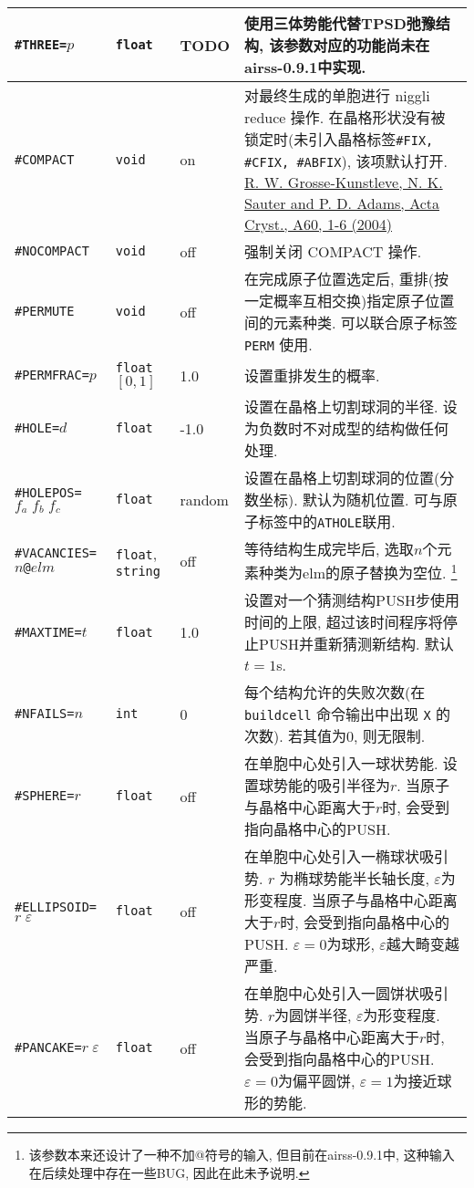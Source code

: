 \documentclass[a4paper, 10pt]{article}
\begin{document}
\begin{center}
\begin{longtable}{m{10em}|m{4em}<{\centering}|m{3em}<{\centering}|m{15em}}
\midrule
\verb|#THREE=|\(p\)& \verb|float| & TODO & 使用三体势能代替TPSD弛豫结构, \textbf{该参数对应的功能尚未在airss-0.9.1中实现}.\\
\midrule
\verb|#COMPACT|& \verb|void| & on & 对最终生成的单胞进行 niggli reduce 操作. 在晶格形状没有被锁定时(未引入晶格标签\verb|#FIX, #CFIX, #ABFIX|), 该项默认打开. \href{http://atztogo.github.io/niggli/#algorithm}{R. W. Grosse-Kunstleve, N. K. Sauter and P. D. Adams, Acta Cryst., A60, 1-6 (2004)} \\
\midrule
\verb|#NOCOMPACT| & \verb|void| & off & 强制关闭 COMPACT 操作.\\
\midrule
\verb|#PERMUTE| & \verb|void| & off & 在完成原子位置选定后, 重排(按一定概率互相交换)指定原子位置间的元素种类. 可以联合原子标签 \verb|PERM| 使用.\\
\midrule
\verb|#PERMFRAC=|\(p\) & \verb|float| \([0,1]\)  & 1.0 & 设置重排发生的概率.\\
\midrule
\verb|#HOLE=|\(d\) & \verb|float| & -1.0 & 设置在晶格上切割球洞的半径. 设为负数时不对成型的结构做任何处理.\\
\midrule
\verb|#HOLEPOS=|\(f_a\;f_b\;f_c\) & \verb|float| & random & 设置在晶格上切割球洞的位置(分数坐标). 默认为随机位置. 可与原子标签中的\verb|ATHOLE|联用.\\
\midrule
\verb|#VACANCIES=|\(n\)\verb|@|\(elm\)& \verb|float|, \verb|string| & off & 等待结构生成完毕后, 选取\(n\)个元素种类为elm的原子替换为空位. \footnote{该参数本来还设计了一种不加@符号的输入, 但目前在airss-0.9.1中, 这种输入在后续处理中存在一些BUG, 因此在此未予说明.}\\
\midrule
\verb|#MAXTIME=|\(t\)& \verb|float| & 1.0 & 设置对一个猜测结构PUSH步使用时间的上限, 超过该时间程序将停止PUSH并重新猜测新结构. 默认\(t=1\)s.\\
\midrule
\verb|#NFAILS=|\(n\)& \verb|int| & 0 & 每个结构允许的失败次数(在 \verb|buildcell| 命令输出中出现 \verb|X| 的次数). 若其值为0, 则无限制.\\
\midrule
\verb|#SPHERE=|\(r\) & \verb|float| & off & 在单胞中心处引入一球状势能. 设置球势能的吸引半径为\(r\). 当原子与晶格中心距离大于\(r\)时, 会受到指向晶格中心的PUSH.\\
\midrule
\verb|#ELLIPSOID=|\(r\;\varepsilon\) & \verb|float|  & off & 在单胞中心处引入一椭球状吸引势. \(r\) 为椭球势能半长轴长度, \(\varepsilon\)为形变程度. 当原子与晶格中心距离大于\(r\)时, 会受到指向晶格中心的PUSH. \(\varepsilon=0\)为球形, \(\varepsilon\)越大畸变越严重. \\
\midrule
\verb|#PANCAKE=|\(r\;\varepsilon\) & \verb|float|  & off & 在单胞中心处引入一圆饼状吸引势. \(r\)为圆饼半径, \(\varepsilon\)为形变程度. 当原子与晶格中心距离大于\(r\)时, 会受到指向晶格中心的PUSH. \(\varepsilon=0\)为偏平圆饼, \(\varepsilon=1\)为接近球形的势能. \\

\end{longtable}
\end{center}
\end{document}
